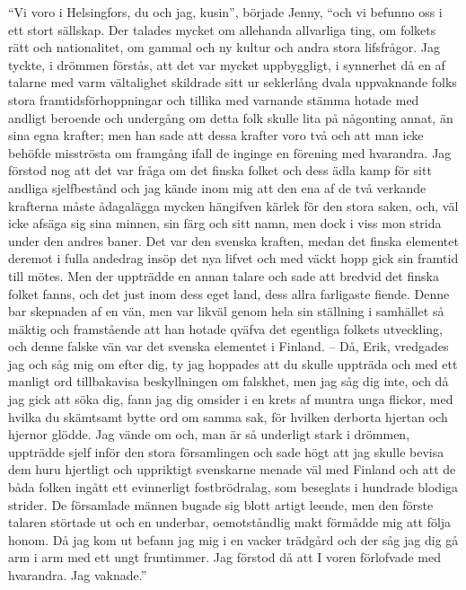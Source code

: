 ``Vi voro i Helsingfors, du och jag, kusin'', började Jenny, ``och vi
befunno oss i ett stort sällskap. Der talades mycket om allehanda
allvarliga ting, om folkets rätt och nationalitet, om gammal och ny
kultur och andra stora lifsfrågor. Jag tyckte, i drömmen förstås, att
det var mycket uppbyggligt, i synnerhet då en af talarne med varm
vältalighet skildrade sitt ur seklerlång dvala uppvaknande folks stora
framtidsförhoppningar och tillika med varnande stämma hotade med andligt
beroende och undergång om detta folk skulle lita på någonting annat, än
sina egna krafter; men han sade att dessa krafter voro två och att man
icke behöfde misströsta om framgång ifall de inginge en förening med
hvarandra. Jag förstod nog att det var fråga om det finska folket och
dess ädla kamp för sitt andliga sjelfbestånd och jag kände inom mig att
den ena af de två verkande krafterna måste ådagalägga mycken hängifven
kärlek för den stora saken, och, väl icke afsäga sig sina minnen, sin
färg och sitt namn, men dock i viss mon strida under den andres baner.
Det var den svenska kraften, medan det finska elementet deremot i fulla
andedrag insöp det nya lifvet och med väckt hopp gick sin framtid till
mötes. Men der uppträdde en annan talare och sade att bredvid det finska
folket fanns, och det just inom dess eget land, dess allra farligaste
fiende. Denne bar skepnaden af en vän, men var likväl genom hela sin
ställning i samhället så mäktig och framstående att han hotade qväfva
det egentliga folkets utveckling, och denne falske vän var det svenska
elementet i Finland. -- Då, Erik, vredgades jag och såg mig om efter
dig, ty jag hoppades att du skulle uppträda och med ett manligt ord
tillbakavisa beskyllningen om falskhet, men jag såg dig inte, och då jag
gick att söka dig, fann jag dig omsider i en krets af muntra unga
flickor, med hvilka du skämtsamt bytte ord om samma sak, för hvilken
derborta hjertan och hjernor glödde. Jag vände om och, man är så
underligt stark i drömmen, uppträdde sjelf inför den stora församlingen
och sade högt att jag skulle bevisa dem huru hjertligt och uppriktigt
svenskarne menade väl med Finland och att de båda folken ingått ett
evinnerligt fostbrödralag, som beseglats i hundrade blodiga strider. De
församlade männen bugade sig blott artigt leende, men den förste talaren
störtade ut och en underbar, oemotståndlig makt förmådde mig att följa
honom. Då jag kom ut befann jag mig i en vacker trädgård och der såg jag
dig gå arm i arm med ett ungt fruntimmer. Jag förstod då att I voren
förlofvade med hvarandra. Jag vaknade.''

